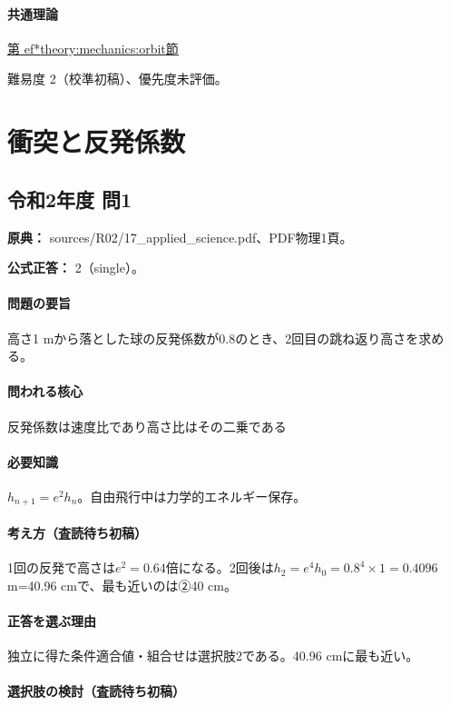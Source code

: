 \paragraph{共通理論} \hyperref[theory:mechanics:orbit]{第
ef*{theory:mechanics:orbit}節}

\par 難易度 2（校準初稿）、優先度未評価。

\section{衝突と反発係数}

\subsection{令和2年度 問1}
\label{q:r02-reg-applied-01}

\noindent\textbf{原典：} sources/R02/17\_applied\_science.pdf、PDF物理1頁。

\textbf{公式正答：} 2（single）。

\paragraph{問題の要旨} 高さ1 mから落とした球の反発係数が0.8のとき、2回目の跳ね返り高さを求める。

\paragraph{問われる核心} 反発係数は速度比であり高さ比はその二乗である

\paragraph{必要知識} \(h_{n+1}=e^2h_n\)。自由飛行中は力学的エネルギー保存。

\paragraph{考え方（査読待ち初稿）} 1回の反発で高さは\(e^2=0.64\)倍になる。2回後は\(h_2=e^4h_0=0.8^4\times1=0.4096\) m=40.96 cmで、最も近いのは②40 cm。

\paragraph{正答を選ぶ理由} 独立に得た条件適合値・組合せは選択肢2である。40.96 cmに最も近い。

\paragraph{選択肢の検討（査読待ち初稿）}

